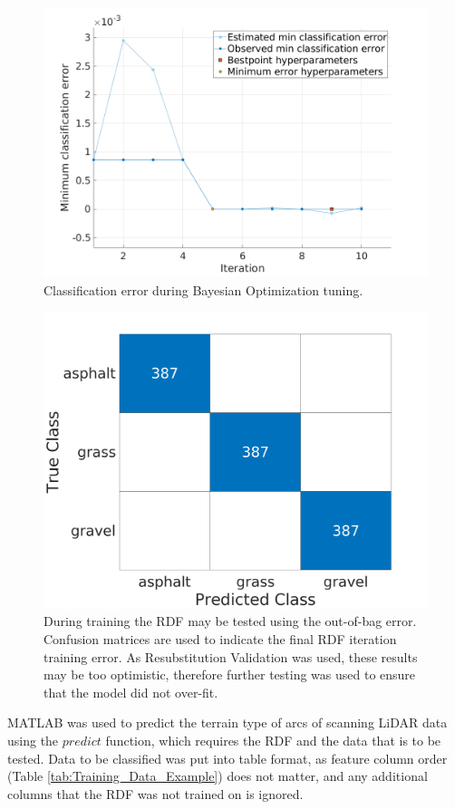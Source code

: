\documentclass[numbered,pdftex]{ohio-etd}
\begin{document}
{{{{				\begin{figure}[H]
					\centering
					\includegraphics[width=0.5\linewidth]{Defense_Images/c2_bayesian_range}
					\caption[Bayesian Optimization - RANGE]{Classification error during Bayesian Optimization tuning.}
					\label{fig:c2_min_class_error}
				\end{figure}				
				
				\begin{figure}[H]
					\centering
					\includegraphics[width=0.65\linewidth]{Defense_Images/chan_2c_conf_OOB_mat222}
					\caption[Out-of-Bag Error]{During training the RDF may be tested using the out-of-bag error. Confusion matrices are used to indicate the final RDF iteration training error. As Resubstitution Validation was used, these results may be too optimistic, therefore further testing was used to ensure that the model did not over-fit.}
					\label{fig:out_of_bag_err_conf_mat}
				\end{figure}
				
				{MATLAB was used to predict the terrain type of arcs of scanning LiDAR data using the $predict$ function, which requires the RDF and the data that is to be tested. Data to be classified was put into table format, as feature column order (Table \ref{tab:Training_Data_Example}) does not matter, and any additional columns that the RDF was not trained on is ignored.}
				
}}}}
\end{document}
